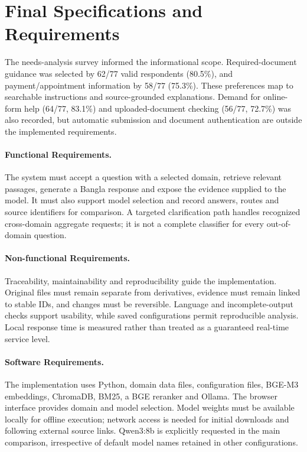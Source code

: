 \section{Final Specifications and Requirements}
The needs-analysis survey informed the informational scope. Required-document guidance was selected by 62/77 valid respondents (80.5\%), and payment/appointment information by 58/77 (75.3\%). These preferences map to searchable instructions and source-grounded explanations. Demand for online-form help (64/77, 83.1\%) and uploaded-document checking (56/77, 72.7\%) was also recorded, but automatic submission and document authentication are outside the implemented requirements.

\paragraph{Functional Requirements.}
The system must accept a question with a selected domain, retrieve relevant passages, generate a Bangla response and expose the evidence supplied to the model. It must also support model selection and record answers, routes and source identifiers for comparison. A targeted clarification path handles recognized cross-domain aggregate requests; it is not a complete classifier for every out-of-domain question.

\paragraph{Non-functional Requirements.}
Traceability, maintainability and reproducibility guide the implementation. Original files must remain separate from derivatives, evidence must remain linked to stable IDs, and changes must be reversible. Language and incomplete-output checks support usability, while saved configurations permit reproducible analysis. Local response time is measured rather than treated as a guaranteed real-time service level.

\paragraph{Software Requirements.}
The implementation uses Python, domain data files, configuration files, BGE-M3 embeddings, ChromaDB, BM25, a BGE reranker and Ollama. The browser interface provides domain and model selection. Model weights must be available locally for offline execution; network access is needed for initial downloads and following external source links. Qwen3:8b is explicitly requested in the main comparison, irrespective of default model names retained in other configurations.

